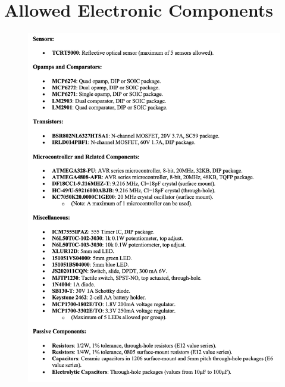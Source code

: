 \documentclass{article}
\begin{document}
\section{Allowed Electronic Components}
\begin{figure}[H]
    \centering
    \includegraphics[width=0.8\linewidth]{REPORT/Screenshot 2024-10-20 at 3.10.45 PM.png}
\end{figure}
\end{document}
